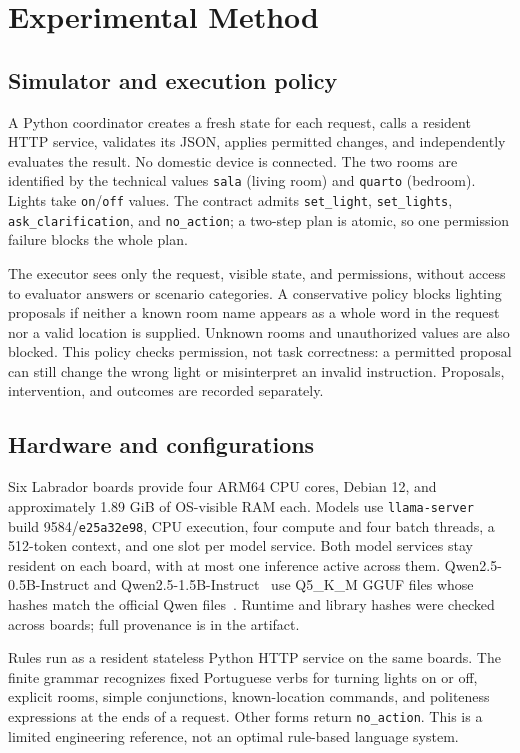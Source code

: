 \documentclass[letterpaper,conference]{IEEEtran}
\begin{document}
\section{Experimental Method}
\subsection{Simulator and execution policy}
A Python coordinator creates a fresh state for each request, calls a resident HTTP service, validates its JSON, applies permitted changes, and independently evaluates the result. No domestic device is connected. The two rooms are identified by the technical values \texttt{sala} (living room) and \texttt{quarto} (bedroom). Lights take \texttt{on}/\texttt{off} values. The contract admits \texttt{set\_light}, \texttt{set\_lights}, \texttt{ask\_clarification}, and \texttt{no\_action}; a two-step plan is atomic, so one permission failure blocks the whole plan.

The executor sees only the request, visible state, and permissions, without access to evaluator answers or scenario categories. A conservative policy blocks lighting proposals if neither a known room name appears as a whole word in the request nor a valid location is supplied. Unknown rooms and unauthorized values are also blocked. This policy checks permission, not task correctness: a permitted proposal can still change the wrong light or misinterpret an invalid instruction. Proposals, intervention, and outcomes are recorded separately.

\subsection{Hardware and configurations}
Six Labrador boards provide four ARM64 CPU cores, Debian 12, and approximately 1.89 GiB of OS-visible RAM each. Models use \texttt{llama-server}~\cite{llamaserver} build 9584/\texttt{e25a32e98}, CPU execution, four compute and four batch threads, a 512-token context, and one slot per model service. Both model services stay resident on each board, with at most one inference active across them. Qwen2.5-0.5B-Instruct and Qwen2.5-1.5B-Instruct~\cite{qwen05,qwen15} use Q5\_K\_M GGUF files whose hashes match the official Qwen files~\cite{qwen05gguf,qwen15gguf}. Runtime and library hashes were checked across boards; full provenance is in the artifact.

Rules run as a resident stateless Python HTTP service on the same boards. The finite grammar recognizes fixed Portuguese verbs for turning lights on or off, explicit rooms, simple conjunctions, known-location commands, and politeness expressions at the ends of a request. Other forms return \texttt{no\_action}. This is a limited engineering reference, not an optimal rule-based language system.
\end{document}
